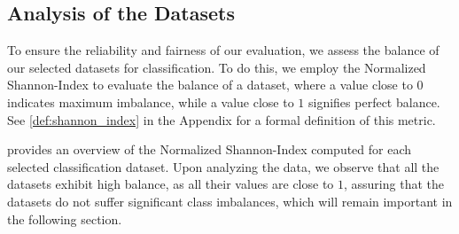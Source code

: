 \subsection{Analysis of the Datasets}
To ensure the reliability and fairness of our evaluation, we assess the balance of our selected datasets for classification. To do this, we employ the \textsf{Normalized Shannon-Index} to evaluate the balance of a dataset, where a value close to $0$ indicates maximum imbalance, while a value close to $1$ signifies perfect balance. See \cref{def:shannon_index} in the Appendix for a formal definition of this metric.

\begin{table}[H]
	\caption{An overview of the \textsf{Normalized Shannon-Index} calculated for each dataset.}
	\label{tab:shannon_index}
	\centering
\end{table}

 provides an overview of the \textsf{Normalized Shannon-Index} computed for each selected classification dataset. Upon analyzing the data, we observe that all the datasets exhibit high balance, as all their values are close to $1$, assuring that the datasets do not suffer significant class imbalances, which will remain important in the following section.

